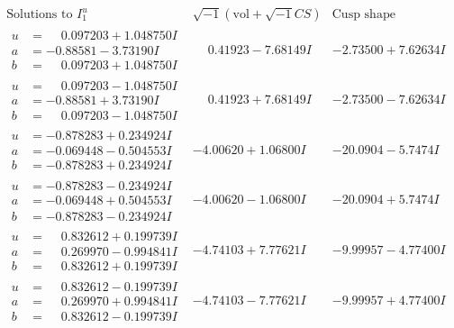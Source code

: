 \documentclass[1p]{elsarticle_modified}
\theoremstyle{definition}
\newcommand{\I}{\sqrt{-1}}
\begin{document}
$$\begin{array}{c|c|c}  
\text{Solutions to }I^u_{1}& \I (\text{vol} + \sqrt{-1}CS) & \text{Cusp shape}\\
 \hline 
\begin{aligned}
u &= \phantom{-}0.097203 + 1.048750 I \\
a &= -0.88581 - 3.73190 I \\
b &= \phantom{-}0.097203 + 1.048750 I\end{aligned}
 & \phantom{-}0.41923 - 7.68149 I & -2.73500 + 7.62634 I \\ \hline\begin{aligned}
u &= \phantom{-}0.097203 - 1.048750 I \\
a &= -0.88581 + 3.73190 I \\
b &= \phantom{-}0.097203 - 1.048750 I\end{aligned}
 & \phantom{-}0.41923 + 7.68149 I & -2.73500 - 7.62634 I \\ \hline\begin{aligned}
u &= -0.878283 + 0.234924 I \\
a &= -0.069448 - 0.504553 I \\
b &= -0.878283 + 0.234924 I\end{aligned}
 & -4.00620 + 1.06800 I & -20.0904 - 5.7474 I \\ \hline\begin{aligned}
u &= -0.878283 - 0.234924 I \\
a &= -0.069448 + 0.504553 I \\
b &= -0.878283 - 0.234924 I\end{aligned}
 & -4.00620 - 1.06800 I & -20.0904 + 5.7474 I \\ \hline\begin{aligned}
u &= \phantom{-}0.832612 + 0.199739 I \\
a &= \phantom{-}0.269970 - 0.994841 I \\
b &= \phantom{-}0.832612 + 0.199739 I\end{aligned}
 & -4.74103 + 7.77621 I & -9.99957 - 4.77400 I \\ \hline\begin{aligned}
u &= \phantom{-}0.832612 - 0.199739 I \\
a &= \phantom{-}0.269970 + 0.994841 I \\
b &= \phantom{-}0.832612 - 0.199739 I\end{aligned}
 & -4.74103 - 7.77621 I & -9.99957 + 4.77400 I \\ \hline\begin{aligned}

\end{aligned}
\end{array}$$
\end{document}
